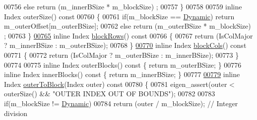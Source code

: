 \begin{DoxyCode}
00756       \textcolor{keywordflow}{else} \textcolor{keywordflow}{return}  (m\_innerBSize * m\_blockSize) ;
00757     \}
00758 
00759     \textcolor{keyword}{inline} Index outerSize()\textcolor{keyword}{ const}
00760 \textcolor{keyword}{    }\{
00761       \textcolor{keywordflow}{if}(m\_blockSize == \hyperlink{namespace_eigen_ad81fa7195215a0ce30017dfac309f0b2}{Dynamic}) \textcolor{keywordflow}{return} m\_outerOffset[m\_outerBSize];
00762       \textcolor{keywordflow}{else} \textcolor{keywordflow}{return}  (m\_outerBSize * m\_blockSize) ;
00763     \}
\hyperlink{group___sparse_core___module_a5f4768ab4e48f7f81cd8a3697d3016e8}{00765}     \textcolor{keyword}{inline} Index \hyperlink{group___sparse_core___module_a5f4768ab4e48f7f81cd8a3697d3016e8}{blockRows}()\textcolor{keyword}{ const}
00766 \textcolor{keyword}{    }\{
00767       \textcolor{keywordflow}{return} (IsColMajor ? m\_innerBSize : m\_outerBSize);
00768     \}
\hyperlink{group___sparse_core___module_a645eb7f708ca89383e0f3fabb30d9e92}{00770}     \textcolor{keyword}{inline} Index \hyperlink{group___sparse_core___module_a645eb7f708ca89383e0f3fabb30d9e92}{blockCols}()\textcolor{keyword}{ const}
00771 \textcolor{keyword}{    }\{
00772       \textcolor{keywordflow}{return} (IsColMajor ? m\_outerBSize : m\_innerBSize);
00773     \}
00774 
00775     \textcolor{keyword}{inline} Index outerBlocks()\textcolor{keyword}{ const }\{ \textcolor{keywordflow}{return} m\_outerBSize; \}
00776     \textcolor{keyword}{inline} Index innerBlocks()\textcolor{keyword}{ const }\{ \textcolor{keywordflow}{return} m\_innerBSize; \}
00777 
\hyperlink{group___sparse_core___module_a9f83554f7b1309ac7ad88d19ef8d6339}{00779}     \textcolor{keyword}{inline} Index \hyperlink{group___sparse_core___module_a9f83554f7b1309ac7ad88d19ef8d6339}{outerToBlock}(Index outer)\textcolor{keyword}{ const}
00780 \textcolor{keyword}{    }\{
00781       eigen\_assert(outer < outerSize() && \textcolor{stringliteral}{"OUTER INDEX OUT OF BOUNDS"});
00782 
00783       \textcolor{keywordflow}{if}(m\_blockSize != \hyperlink{namespace_eigen_ad81fa7195215a0ce30017dfac309f0b2}{Dynamic})
00784         \textcolor{keywordflow}{return} (outer / m\_blockSize); \textcolor{comment}{// Integer division}

\end{DoxyCode}
